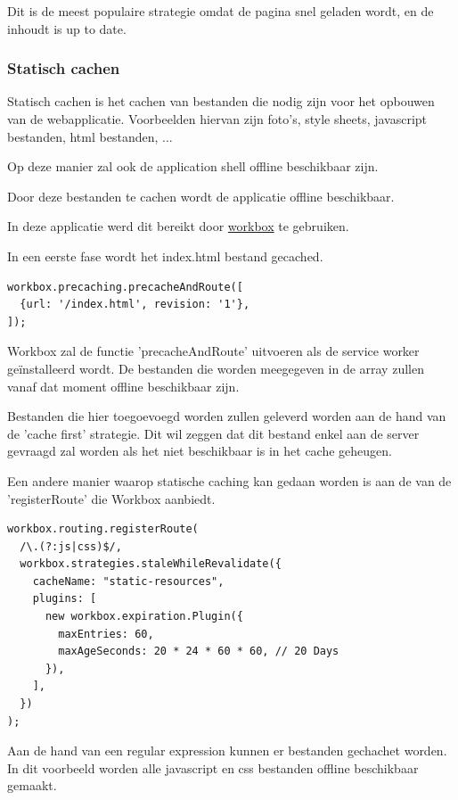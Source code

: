 				Dit is de meest populaire strategie omdat de pagina snel geladen wordt, en de inhoudt is up to date.

		\subsubsection{Statisch cachen}
			Statisch cachen is het cachen van bestanden die nodig zijn voor het opbouwen van de webapplicatie. Voorbeelden hiervan zijn foto's, style sheets, javascript bestanden, html bestanden, ...
			
			Op deze manier zal ook de application shell offline beschikbaar zijn.
			
			Door deze bestanden te cachen wordt de applicatie offline beschikbaar.
			
			In deze applicatie werd dit bereikt door \href{https://developers.google.com/web/tools/workbox}{workbox} te gebruiken.
			
			In een eerste fase wordt het index.html bestand gecached.
\begin{lstlisting}
workbox.precaching.precacheAndRoute([
  {url: '/index.html', revision: '1'},
]);
\end{lstlisting}
		
			Workbox zal de functie 'precacheAndRoute' uitvoeren als de service worker geïnstalleerd wordt. De bestanden die worden meegegeven in de array zullen vanaf dat moment offline beschikbaar zijn.
			\autocite{Workbox2020a}
			
			Bestanden die hier toegoevoegd worden zullen geleverd worden aan de hand van de 'cache first' strategie. Dit wil zeggen dat dit bestand enkel aan de server gevraagd zal worden als het niet beschikbaar is in het cache geheugen.
			
			Een andere manier waarop statische caching kan gedaan worden is aan de van de 'registerRoute' die Workbox aanbiedt. 
			
\begin{lstlisting}
workbox.routing.registerRoute(
  /\.(?:js|css)$/,
  workbox.strategies.staleWhileRevalidate({
    cacheName: "static-resources",
    plugins: [
      new workbox.expiration.Plugin({
        maxEntries: 60,
        maxAgeSeconds: 20 * 24 * 60 * 60, // 20 Days
      }),
    ],
  })
);
\end{lstlisting}
			
			Aan de hand van een regular expression kunnen er bestanden gechachet worden. In dit voorbeeld worden alle javascript en css bestanden offline beschikbaar gemaakt.
			
